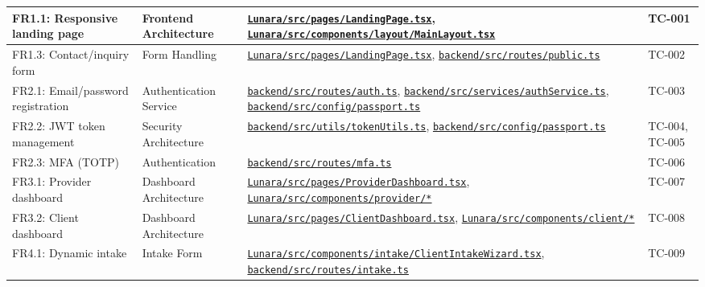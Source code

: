 \documentclass[12pt,letterpaper]{article}
\newcommand{\ghrepo}{https://github.com/omniV1/lunaraCare}
\begin{document}
{\begin{longtable}{|>{\raggedright\arraybackslash}p{2.2cm}|>{\raggedright\arraybackslash}p{2.5cm}|>{\raggedright\arraybackslash}p{5.5cm}|>{\raggedright\arraybackslash}p{2.5cm}|}
FR1.1: Responsive landing page & Frontend Architecture & \href{\ghrepo/blob/main/Lunara/src/pages/LandingPage.tsx}{\texttt{Lunara/src/pages/LandingPage.tsx}}, \href{\ghrepo/blob/main/Lunara/src/components/layout/MainLayout.tsx}{\texttt{Lunara/src/components/layout/MainLayout.tsx}} & TC-001 \\
\hline
\rowcolor{TableRowAlt}
FR1.3: Contact/inquiry form & Form Handling & \href{\ghrepo/blob/main/Lunara/src/pages/LandingPage.tsx}{\texttt{Lunara/src/pages/LandingPage.tsx}}, \href{\ghrepo/blob/main/backend/src/routes/public.ts}{\texttt{backend/src/routes/public.ts}} & TC-002 \\
\hline
FR2.1: Email/password registration & Authentication Service & \href{\ghrepo/blob/main/backend/src/routes/auth.ts}{\texttt{backend/src/routes/auth.ts}}, \href{\ghrepo/blob/main/backend/src/services/authService.ts}{\texttt{backend/src/services/authService.ts}}, \href{\ghrepo/blob/main/backend/src/config/passport.ts}{\texttt{backend/src/config/passport.ts}} & TC-003 \\
\hline
\rowcolor{TableRowAlt}
FR2.2: JWT token management & Security Architecture & \href{\ghrepo/blob/main/backend/src/utils/tokenUtils.ts}{\texttt{backend/src/utils/tokenUtils.ts}}, \href{\ghrepo/blob/main/backend/src/config/passport.ts}{\texttt{backend/src/config/passport.ts}} & TC-004, TC-005 \\
\hline
FR2.3: MFA (TOTP) & Authentication & \href{\ghrepo/blob/main/backend/src/routes/mfa.ts}{\texttt{backend/src/routes/mfa.ts}} & TC-006 \\
\hline
\rowcolor{TableRowAlt}
FR3.1: Provider dashboard & Dashboard Architecture & \href{\ghrepo/blob/main/Lunara/src/pages/ProviderDashboard.tsx}{\texttt{Lunara/src/pages/ProviderDashboard.tsx}}, \href{\ghrepo/tree/main/Lunara/src/components/provider}{\texttt{Lunara/src/components/provider/*}} & TC-007 \\
\hline
FR3.2: Client dashboard & Dashboard Architecture & \href{\ghrepo/blob/main/Lunara/src/pages/ClientDashboard.tsx}{\texttt{Lunara/src/pages/ClientDashboard.tsx}}, \href{\ghrepo/tree/main/Lunara/src/components/client}{\texttt{Lunara/src/components/client/*}} & TC-008 \\
\hline
\rowcolor{TableRowAlt}
FR4.1: Dynamic intake & Intake Form & \href{\ghrepo/blob/main/Lunara/src/components/intake/ClientIntakeWizard.tsx}{\texttt{Lunara/src/components/intake/ClientIntakeWizard.tsx}}, \href{\ghrepo/blob/main/backend/src/routes/intake.ts}{\texttt{backend/src/routes/intake.ts}} & TC-009 \\

\end{longtable}}
\end{document}
